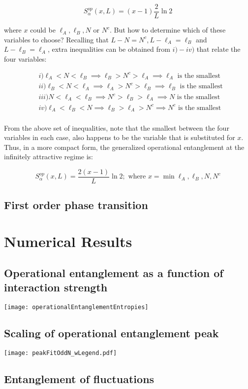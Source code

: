\begin{equation}
S_\alpha^{op}(x,L) = (x - 1) \frac{2}{L} \ln{2}
\end{equation}

where $x$ could be  $\ell_A, \ell_B, N$ or $N^c$. But how to determine which of these variables to choose? Recalling that $L-N = N^c, L-\ell_A = \ell_B$ and $L-\ell_B = \ell_A$, extra inequalities can be obtained from $i)-iv)$ that relate the four variables:

\begin{align}
& i) \ell_{A} < N < \ell_{B} \implies \ell_{B} > N^c > \ell_{A} \implies \ell_{A} \text{ is the smallest} \\
& ii) \ell_{B} < N < \ell_{A} \implies \ell_{A} > N^c > \ell_{B} \implies \ell_{B} \text{ is the smallest} \\
& iii)  N < \ell_{A} < \ell_{B} \implies N^c > \ell_{B} > \ell_{A} \implies N \text{ is the smallest} \\
& iv) \ell_{A} < \ell_{B} < N \implies \ell_{B} > \ell_{A} > N^c \implies N^c \text{ is the smallest} \\
\end{align}

From the above set of inequalities, note that the smallest between the four variables in each case, also happens to be the variable that is substituted for $x$. Thus, in a more compact form, the generalized operational entanglement at the infinitely attractive regime is:

\begin{equation}
S_\alpha^{op}(x,L) = \frac{2(x-1)}{L} \ln{2} ; \text{ where } x = \min{\ell_A, \ell_B, N, N^c}
\end{equation}

	\subsection{First order phase transition}
	
\section{Numerical Results}
	\subsection{Operational entanglement as a function of interaction strength}
		\texttt{[image: operationalEntanglementEntropies]}
	\subsection{Scaling of operational entanglement peak}
		\texttt{[image: peakFitOddN\_wLegend.pdf]}
	\subsection{Entanglement of fluctuations}
	
